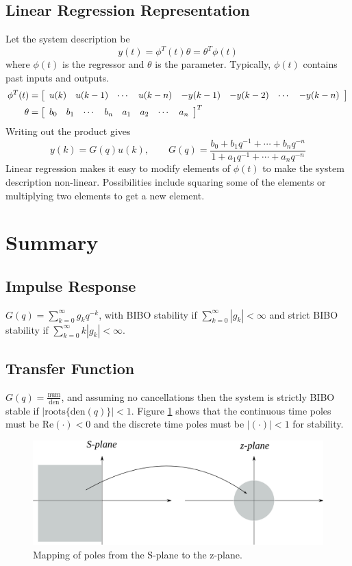 \subsection{Linear Regression Representation}
\label{sec:linearregression}
Let the system description be
$$y(t)=\phi^T(t)\theta = \theta^T\phi(t)$$
where $\phi(t)$ is the regressor and $\theta$ is the parameter. Typically, $\phi(t)$ contains past inputs and outputs.
\begin{align*}
\phi^T(t) &= \left[\begin{array}{c c c c c c c c}
u(k) & u(k-1) & \cdots & u(k-n) & -y(k-1) & -y(k-2) & \cdots & -y(k-n) \end{array}\right] \\
\theta &= \left[\begin{array}{c c c c c c c c}
b_0 & b_1 & \cdots & b_n & a_1 & a_2 & \cdots & a_n \end{array}\right]^T
\end{align*}
Writing out the product gives
$$y(k) = G(q)u(k), \qquad G(q) = \frac{b_0+b_1q^{-1}+\cdots+b_nq^{-n}}{1+a_1q^{-1}+\cdots+a_nq^{-n}}$$
Linear regression makes it easy to modify elements of $\phi(t)$ to make the system description non-linear. Possibilities include squaring some of the elements or multiplying two elements to get a new element.

\section{Summary}
\subsection{Impulse Response}
$G(q) = \sum_{k=0}^\infty g_kq^{-k}$, with BIBO stability if $\sum_{k=0}^\infty |g_k| < \infty$ and strict BIBO stability if $\sum_{k=0}^\infty k|g_k| < \infty$.

\subsection{Transfer Function}
$G(q) = \frac{\text{num}}{\text{den}}$, and assuming no cancellations then the system is strictly BIBO stable if $|\text{roots}\lbrace \text{den}(q)\rbrace|<1$. Figure \ref{fig:03poleMapSZ} shows that the continuous time poles must be $\text{Re}(\cdot) < 0$ and the discrete time poles must be $|(\cdot)| < 1$ for stability.
\begin{figure}[ht!]
	\centering
	\includegraphics[width=.6\textwidth]{images/03poleMapSZ}
	\caption{Mapping of poles from the S-plane to the z-plane.}
	\label{fig:03poleMapSZ}
\end{figure}

